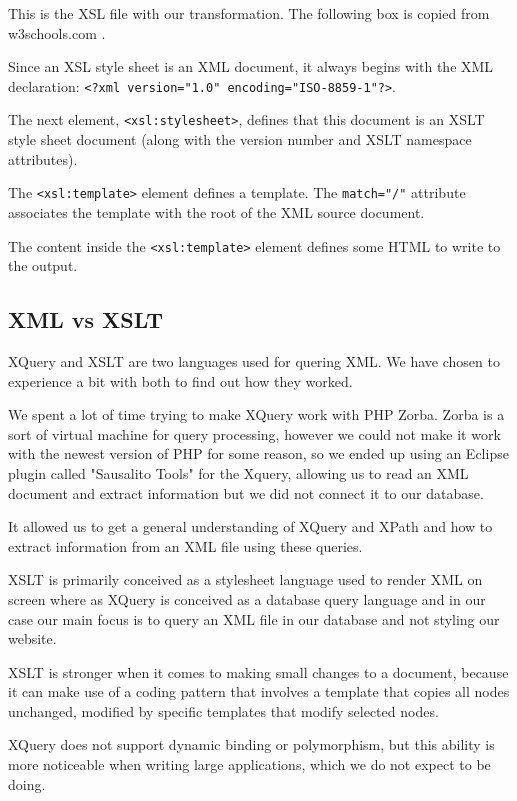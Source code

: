 \documentclass[a4paper,12pt]{article}
\begin{document}
This is the XSL file with our transformation. The following box is copied from w3schools.com \citep{w3xslt}.

\begin{framed}
Since an XSL style sheet is an XML document, it always begins with the XML declaration: \lstinline$<?xml version="1.0" encoding="ISO-8859-1"?>$.

The next element, \lstinline$<xsl:stylesheet>$, defines that this document is an XSLT style sheet document (along with the version number and XSLT namespace attributes).

The \lstinline$<xsl:template>$ element defines a template. The \lstinline$match="/"$ attribute associates the template with the root of the XML source document.

The content inside the \lstinline$<xsl:template>$ element defines some HTML to write to the output.
\end{framed}

\subsection{XML vs XSLT}

XQuery and XSLT are two languages used for quering XML. We have chosen to experience a bit with both  to find out how they worked.

We spent a lot of time trying to make XQuery work with PHP Zorba. Zorba is a sort of virtual machine for query processing, however we could not make it work with the newest version of PHP for some reason, so we ended up using an Eclipse plugin called  "Sausalito Tools" for the Xquery, allowing us to read an XML document and extract information but we did not connect it to our database. 

It allowed us to get a general understanding of XQuery and XPath and how to extract information from an XML file using these queries. 

XSLT is primarily conceived as a stylesheet language used to render XML on screen where as XQuery is conceived as a database query language and in our case our main focus is to query an XML file in our database and not styling our website. 

XSLT is stronger when it comes to making small changes to a document, because it can make use of a coding pattern that involves a template that copies all nodes unchanged, modified by specific templates that modify selected nodes.

XQuery does not support dynamic binding or polymorphism, but this ability is more noticeable when writing large applications, which we do not expect to be doing. 
\end{document}
